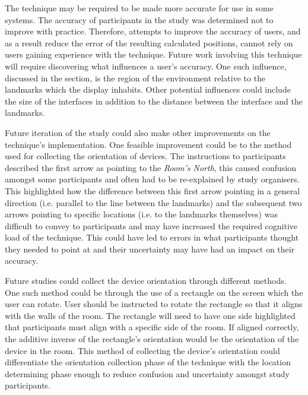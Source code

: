 \documentclass{bmcart}
\begin{document}
The technique may be required to be made more accurate for use in some systems.
The accuracy of participants in the study was determined not to improve with practice.
Therefore, attempts to improve the accuracy of users, and as a result reduce the error of the resulting calculated positions, cannot rely on users gaining experience with the technique.
Future work involving this technique will require discovering what influences a user's accuracy.
One such influence, discussed in the  section, is the region of the environment relative to the landmarks which the display inhabits.
Other potential influences could include the size of the interfaces in addition to the distance between the interface and the landmarks.

Future iteration of the study could also make other improvements on the technique's implementation.
One feasible improvement could be to the method used for collecting the orientation of devices.
The instructions to participants described the first arrow as pointing to the \emph{Room's North}, this caused confusion amongst some participants and often had to be re-explained by study organisers.
This highlighted how the difference between this first arrow pointing in a general direction (i.e. parallel to the line between the landmarks) and the subsequent two arrows pointing to specific locations (i.e. to the landmarks themselves) was difficult to convey to participants and may have increased the required cognitive load of the technique.
This could have led to errors in what participants thought they needed to point at and their uncertainty may have had an impact on their accuracy.

Future studies could collect the device orientation through different methods.
One such method could be through the use of a rectangle on the screen which the user can rotate.
User should be instructed to rotate the rectangle so that it aligns with the walls of the room.
The rectangle will need to have one side highlighted that participants must align with a specific side of the room.
If aligned correctly, the additive inverse of the rectangle's orientation would be the orientation of the device in the room.
This method of collecting the device's orientation could differentiate the orientation collection phase of the technique with the location determining phase enough to reduce confusion and uncertainty amongst study participants.
\end{document}
